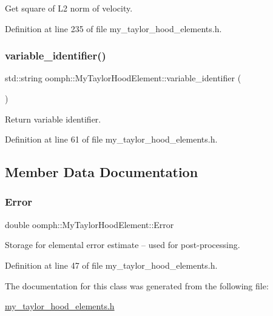 Get square of L2 norm of velocity. 



Definition at line 235 of file my\+\_\+taylor\+\_\+hood\+\_\+elements.\+h.

\mbox{\label{classoomph_1_1MyTaylorHoodElement_a429987090e76cd39a657b3a8eefbbbe9}} 
\subsubsection{\texorpdfstring{variable\+\_\+identifier()}{variable\_identifier()}}
{\footnotesize\ttfamily std\+::string oomph\+::\+My\+Taylor\+Hood\+Element\+::variable\+\_\+identifier (\begin{DoxyParamCaption}{ }\end{DoxyParamCaption})\hspace{0.3cm}{\ttfamily [inline]}}



Return variable identifier. 



Definition at line 61 of file my\+\_\+taylor\+\_\+hood\+\_\+elements.\+h.



\subsection{Member Data Documentation}
\mbox{\label{classoomph_1_1MyTaylorHoodElement_a381cf2cdb628fb7aacfd6dd59dc2996b}} 
\subsubsection{\texorpdfstring{Error}{Error}}
{\footnotesize\ttfamily double oomph\+::\+My\+Taylor\+Hood\+Element\+::\+Error\hspace{0.3cm}{\ttfamily [private]}}



Storage for elemental error estimate -- used for post-\/processing. 



Definition at line 47 of file my\+\_\+taylor\+\_\+hood\+\_\+elements.\+h.



The documentation for this class was generated from the following file\+:\begin{DoxyCompactItemize}
\item 
\hyperlink{my__taylor__hood__elements_8h}{my\+\_\+taylor\+\_\+hood\+\_\+elements.\+h}\end{DoxyCompactItemize}
